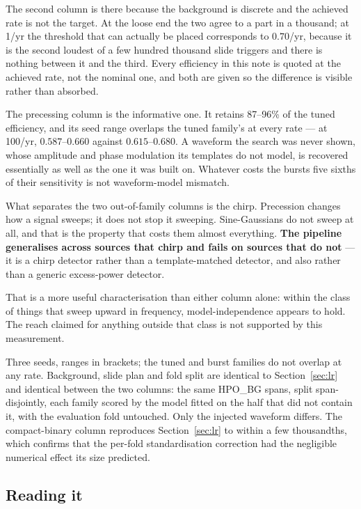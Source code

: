 \documentclass[11pt]{article}
\begin{document}
The second column is there because the background is discrete and the achieved rate is
not the target. At the loose end the two agree to a part in a thousand; at 1/yr the
threshold that can actually be placed corresponds to $0.70$/yr, because it is the second
loudest of a few hundred thousand slide triggers and there is nothing between it and the
third. Every efficiency in this note is quoted at the achieved rate, not the nominal one,
and both are given so the difference is visible rather than absorbed.

The precessing column is the informative one. It retains 87--96\% of the tuned
efficiency, and its seed range overlaps the tuned family's at every rate --- at 100/yr,
$0.587$--$0.660$ against $0.615$--$0.680$. A waveform the search was never shown, whose
amplitude and phase modulation its templates do not model, is recovered essentially as
well as the one it was built on. Whatever costs the bursts five sixths of their
sensitivity is not waveform-model mismatch.

What separates the two out-of-family columns is the chirp. Precession changes how a
signal sweeps; it does not stop it sweeping. Sine-Gaussians do not sweep at all, and that
is the property that costs them almost everything. \textbf{The pipeline generalises across
sources that chirp and fails on sources that do not} --- it is a chirp detector rather
than a template-matched detector, and also rather than a generic excess-power detector.

That is a more useful characterisation than either column alone: within the class of
things that sweep upward in frequency, model-independence appears to hold. The reach
claimed for anything outside that class is not supported by this measurement.

Three seeds, ranges in brackets; the tuned and burst families do not overlap at any rate.
Background, slide plan and fold split are identical to Section~\ref{sec:lr} and identical
between the two columns: the same HPO\_BG spans, split span-disjointly, each family
scored by the model fitted on the half that did not contain it, with the evaluation fold
untouched. Only the injected waveform differs. The compact-binary column reproduces
Section~\ref{sec:lr} to within a few thousandths, which confirms that the per-fold
standardisation correction had the negligible numerical effect its size predicted.

\subsection*{Reading it}
\end{document}
